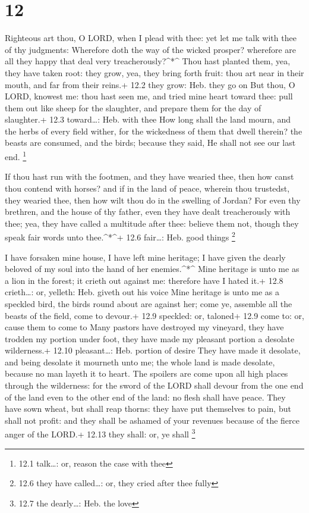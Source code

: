\hypertarget{section-11}{%
\section{12}\label{section-11}}

 Righteous art thou, O LORD, when I plead with thee: yet let
me talk with thee of thy judgments: Wherefore doth the way of the wicked
prosper? wherefore are all they happy that deal very
treacherously?\^{}*\^{}  Thou hast planted them, yea, they
have taken root: they grow, yea, they bring forth fruit: thou art near
in their mouth, and far from their reins.+ 12.2 they grow: Heb. they go
on  But thou, O LORD, knowest me: thou hast seen me, and
tried mine heart toward thee: pull them out like sheep for the
slaughter, and prepare them for the day of slaughter.+ 12.3
toward\ldots: Heb. with thee  How long shall the land mourn,
and the herbs of every field wither, for the wickedness of them that
dwell therein? the beasts are consumed, and the birds; because they
said, He shall not see our last end. \footnote{12.1 talk\ldots: or,
  reason the case with thee}

 If thou hast run with the footmen, and they have wearied
thee, then how canst thou contend with horses? and if in the land of
peace, wherein thou trustedst, they wearied thee, then how wilt thou do
in the swelling of Jordan?  For even thy brethren, and the
house of thy father, even they have dealt treacherously with thee; yea,
they have called a multitude after thee: believe them not, though they
speak fair words unto thee.\^{}*\^{}+ 12.6 fair\ldots: Heb. good things
\footnote{12.6 they have called\ldots: or, they cried after thee fully}

 I have forsaken mine house, I have left mine heritage; I
have given the dearly beloved of my soul into the hand of her
enemies.\^{}*\^{}  Mine heritage is unto me as a lion in the
forest; it crieth out against me: therefore have I hated it.+ 12.8
crieth\ldots: or, yelleth: Heb. giveth out his voice  Mine
heritage is unto me as a speckled bird, the birds round about are
against her; come ye, assemble all the beasts of the field, come to
devour.+ 12.9 speckled: or, taloned+ 12.9 come to: or, cause them to
come to  Many pastors have destroyed my vineyard, they have
trodden my portion under foot, they have made my pleasant portion a
desolate wilderness.+ 12.10 pleasant\ldots: Heb. portion of desire
 They have made it desolate, and being desolate it mourneth
unto me; the whole land is made desolate, because no man layeth it to
heart.  The spoilers are come upon all high places through
the wilderness: for the sword of the LORD shall devour from the one end
of the land even to the other end of the land: no flesh shall have
peace.  They have sown wheat, but shall reap thorns: they
have put themselves to pain, but shall not profit: and they shall be
ashamed of your revenues because of the fierce anger of the LORD.+ 12.13
they shall: or, ye shall \footnote{12.7 the dearly\ldots: Heb. the love}

